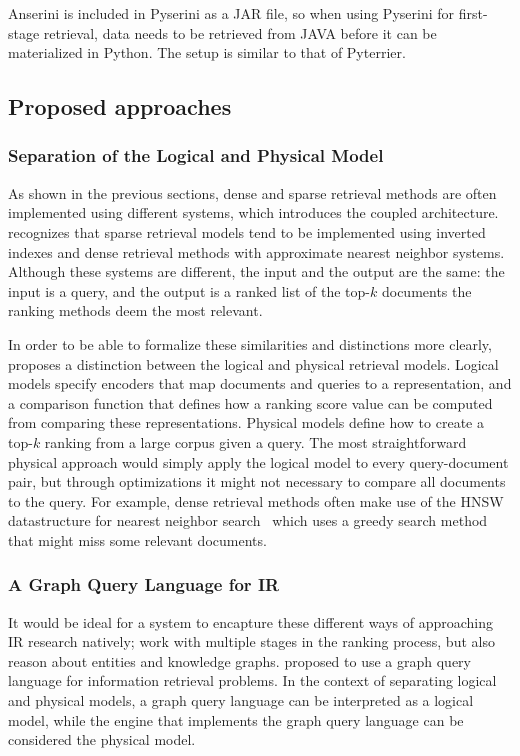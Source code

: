 Anserini is included in Pyserini as a JAR file, so when using Pyserini for first-stage retrieval, data needs to be retrieved from JAVA before it can be materialized in Python. The setup is similar to that of Pyterrier. 

\subsection{Proposed approaches}
\subsubsection{Separation of the Logical and Physical Model}
As shown in the previous sections, dense and sparse retrieval methods are often implemented using different systems, which  introduces the coupled architecture. \citet{seperation-logical-physical} recognizes that sparse retrieval models tend to be implemented using inverted indexes and dense retrieval methods with approximate nearest neighbor systems. Although these systems are different, the input and the output are the same: the input is a query, and the output is a ranked list of the top-$k$ documents the ranking methods deem the most relevant. 

In order to be able to formalize these similarities and distinctions more clearly, \citeauthor{seperation-logical-physical} proposes a distinction between the logical and physical retrieval models. Logical models specify encoders that map documents and queries to a representation, and a comparison function that defines how a ranking score value can be computed from comparing these representations. Physical models define how to create a top-$k$ ranking from a large corpus given a query. The most straightforward physical approach would simply apply the logical model to every query-document pair, but through optimizations it might not necessary to compare all documents to the query. For example, dense retrieval methods often make use of the HNSW datastructure for nearest neighbor search~\citep{faiss} which uses a greedy search method that might miss some relevant documents.

\subsubsection{A Graph Query Language for IR}
It would be ideal for a system to encapture these different ways of approaching IR research natively; work with multiple stages in the ranking process, but also reason about entities and knowledge graphs. 
\citet{need-graph-db} proposed to use a graph query language for information retrieval problems. In the context of separating logical and physical models, a graph query language can be interpreted as a logical model, while the engine that implements the graph query language can be considered the physical model.

